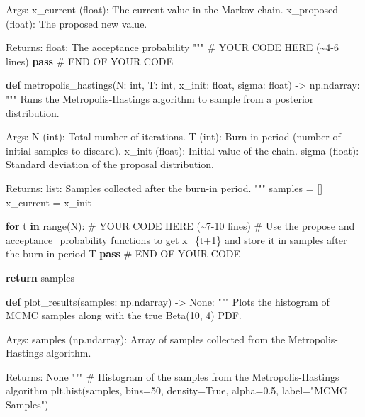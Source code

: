 \documentclass[
  letterpaper,
  numbers=noenddot,
  DIV=11]{scrreprt}
\newenvironment{Shaded}{\begin{snugshade}}{\end{snugshade}}
\newcommand{\BuiltInTok}[1]{\textcolor[rgb]{0.00,0.23,0.31}{#1}}
\newcommand{\CommentTok}[1]{\textcolor[rgb]{0.37,0.37,0.37}{#1}}
\newcommand{\ControlFlowTok}[1]{\textcolor[rgb]{0.00,0.23,0.31}{\textbf{#1}}}
\newcommand{\DecValTok}[1]{\textcolor[rgb]{0.68,0.00,0.00}{#1}}
\newcommand{\FloatTok}[1]{\textcolor[rgb]{0.68,0.00,0.00}{#1}}
\newcommand{\KeywordTok}[1]{\textcolor[rgb]{0.00,0.23,0.31}{\textbf{#1}}}
\newcommand{\NormalTok}[1]{\textcolor[rgb]{0.00,0.23,0.31}{#1}}
\newcommand{\OperatorTok}[1]{\textcolor[rgb]{0.37,0.37,0.37}{#1}}
\newcommand{\RegionMarkerTok}[1]{\textcolor[rgb]{0.00,0.23,0.31}{#1}}
\newcommand{\StringTok}[1]{\textcolor[rgb]{0.13,0.47,0.30}{#1}}
\newcommand{\VariableTok}[1]{\textcolor[rgb]{0.07,0.07,0.07}{#1}}
\theoremstyle{definition}
\theoremstyle{plain}
\theoremstyle{plain}
\theoremstyle{remark}
\begin{document}
\begin{tcolorbox}[colframe=.grey, title=\faCode \enspace Code]
\begin{Shaded}
\begin{Highlighting}[numbers=left,,]
\CommentTok{    Args:}
\CommentTok{    x\_current (float): The current value in the Markov chain.}
\CommentTok{    x\_proposed (float): The proposed new value.}

\CommentTok{    Returns:}
\CommentTok{    float: The acceptance probability}
\CommentTok{    """}
    \CommentTok{\# YOUR CODE HERE (\textasciitilde{}4{-}6 lines)}
    \ControlFlowTok{pass}
    \CommentTok{\# }\RegionMarkerTok{END}\CommentTok{ OF YOUR CODE}


\KeywordTok{def}\NormalTok{ metropolis\_hastings(N: }\BuiltInTok{int}\NormalTok{, T: }\BuiltInTok{int}\NormalTok{, x\_init: }\BuiltInTok{float}\NormalTok{, sigma: }\BuiltInTok{float}\NormalTok{) }\OperatorTok{{-}\textgreater{}}\NormalTok{ np.ndarray:}
    \CommentTok{"""}
\CommentTok{    Runs the Metropolis{-}Hastings algorithm to sample from a posterior distribution.}

\CommentTok{    Args:}
\CommentTok{    N (int): Total number of iterations.}
\CommentTok{    T (int): Burn{-}in period (number of initial samples to discard).}
\CommentTok{    x\_init (float): Initial value of the chain.}
\CommentTok{    sigma (float): Standard deviation of the proposal distribution.}

\CommentTok{    Returns:}
\CommentTok{    list: Samples collected after the burn{-}in period.}
\CommentTok{    """}
\NormalTok{    samples }\OperatorTok{=}\NormalTok{ []}
\NormalTok{    x\_current }\OperatorTok{=}\NormalTok{ x\_init}

    \ControlFlowTok{for}\NormalTok{ t }\KeywordTok{in} \BuiltInTok{range}\NormalTok{(N):}
        \CommentTok{\# YOUR CODE HERE (\textasciitilde{}7{-}10 lines)}
        \CommentTok{\# Use the propose and acceptance\_probability functions to get x\_\{t+1\} and store it in samples after the burn{-}in period T}
        \ControlFlowTok{pass}
        \CommentTok{\# }\RegionMarkerTok{END}\CommentTok{ OF YOUR CODE}

    \ControlFlowTok{return}\NormalTok{ samples}


\KeywordTok{def}\NormalTok{ plot\_results(samples: np.ndarray) }\OperatorTok{{-}\textgreater{}} \VariableTok{None}\NormalTok{:}
    \CommentTok{"""}
\CommentTok{    Plots the histogram of MCMC samples along with the true Beta(10, 4) PDF.}

\CommentTok{    Args:}
\CommentTok{    samples (np.ndarray): Array of samples collected from the Metropolis{-}Hastings algorithm.}

\CommentTok{    Returns:}
\CommentTok{    None}
\CommentTok{    """}
    \CommentTok{\# Histogram of the samples from the Metropolis{-}Hastings algorithm}
\NormalTok{    plt.hist(samples, bins}\OperatorTok{=}\DecValTok{50}\NormalTok{, density}\OperatorTok{=}\VariableTok{True}\NormalTok{, alpha}\OperatorTok{=}\FloatTok{0.5}\NormalTok{, label}\OperatorTok{=}\StringTok{"MCMC Samples"}\NormalTok{)}


\end{Highlighting}
\end{Shaded}
\end{tcolorbox}
\end{document}
